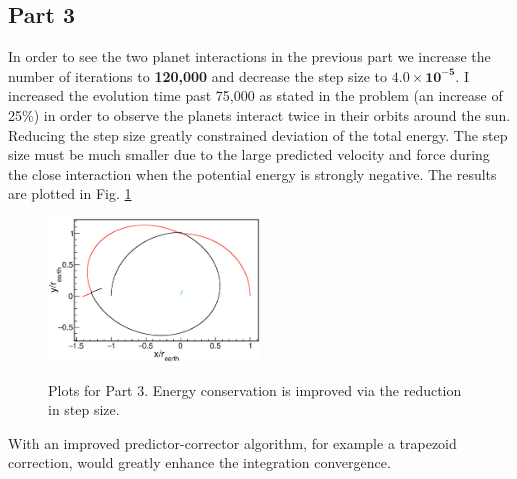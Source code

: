 \documentclass[singlepage,notitlepage,nofootinbib,11pt]{revtex4-1}
\begin{document}
\subsection{Part 3}
In order to see the two planet interactions in the previous part we increase the number of iterations to {\bf 120,000} and decrease the step size to $\mathbf{4.0\times10^{-5}}$. I increased the evolution time past 75,000 as stated in the problem (an increase of 25\%) in order to observe the planets interact twice in their orbits around the sun. Reducing the step size greatly constrained deviation of the total energy. The step size must be much smaller due to the large predicted velocity and force during the close interaction when the potential energy is strongly negative. The results are plotted in Fig. \ref{fig3}
\begin{figure}[h]
  \centering
  \includegraphics[width=0.5\textwidth]{figures/3r.eps}
  \\
\hfill
  \caption{\label{fig3} Plots for Part 3. Energy conservation is improved via the reduction in step size.}
\end{figure}
With an improved predictor-corrector algorithm, for example a trapezoid correction, would greatly enhance the integration convergence.
\clearpage
\end{document}
